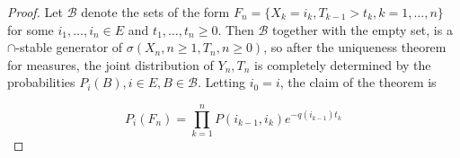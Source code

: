 \documentclass[12pt,a4paper]{scrartcl}
\numberwithin{equation}{section}
\begin{document}
\begin{proof}
Let $ \mathcal{B} $ denote the sets of the form $ F_n = \lbrace X_k = i_k, T_{k-1} > t_k, k=1,\ldots,n \rbrace  $ for some $i_1,\ldots,i_n \in E$ and $t_1,\ldots,t_n \geq 0 $. Then $ \mathcal{B}$ together with the empty set, is a $\cap$-stable generator of $\sigma\left(X_n, n \geq 1 , T_n, n \geq 0 \right)$, so after the uniqueness theorem for measures, the joint distribution of $ Y_n, T_n $ is completely determined by the probabilities $ P_i\left(B\right) , i \in E, B \in  \mathcal{B}. $
Letting $i_0 = i$, the claim of the theorem is

\begin{equation}
P_i\left(F_n\right) = \prod_{k=1}^n P\left(i_{k-1}, i_k\right) e^{-q\left(i_{k-1}\right)t_k }
\label{eq:equitoclaim}
\end{equation}


\end{proof}
\end{document}
